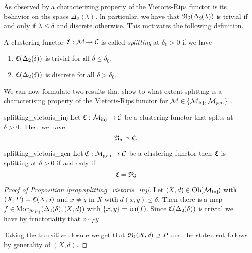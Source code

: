 As observed by \cite[Thm.~6.4]{Carlsson2010} a characterizing property of the Vietoris-Rips functor is its behavior on the space $\Delta_2(\lambda)$. In particular, we have that $\mathfrak{R}_\delta(\Delta_2(\lambda))$ is trivial if and only if $\lambda \le \delta$ and discrete otherwise.
This motivates the following definition.

\begin{definition}{}{}
    A clustering functor $\mathfrak{C}: \mathcal{M} \to \mathcal{C}$ is called \emph{splitting} at $\delta_0 > 0$ if we have
    \begin{enumerate}
        \item $\mathfrak{C}(\Delta_2(\delta))$ is trivial for all $\delta \leq \delta_0$.
        \item $\mathfrak{C}(\Delta_2(\delta))$ is discrete for all $\delta > \delta_0$.
    \end{enumerate}
\end{definition}

We can now formulate two results that show to what extent splitting is a characterizing property of the Vietoris-Rips functor for $\mathcal{M} \in \{{\mathcal{M}_\mathrm{inj}}, {\mathcal{M}_\mathrm{gen}}\}$ \cite[Thm.~6.4]{Carlsson2010}.

\begin{proposition}{}{splitting_vietoris_inj}
    Let $\mathfrak{C}: {\mathcal{M}_\mathrm{inj}} \to \mathcal{C}$ be a clustering functor that splits at $\delta > 0$. Then we have 
    $$
    \mathfrak{R}_\delta \preceq \mathfrak{C}.
    $$
\end{proposition}


\begin{proposition}{}{splitting_vietoris_gen}
    Let $\mathfrak{C}: {\mathcal{M}_\mathrm{gen}} \to \mathcal{C}$ be a clustering functor then $\mathfrak{C}$ is splitting at $\delta > 0$ if and only if 
    $$
    \mathfrak{C} = \mathfrak{R}_\delta
    $$
\end{proposition}

\begin{proof}[Proof of Proposition \ref{prop:splitting_vietoris_inj}]
    Let $(X,d) \in \mathrm {Ob}({\mathcal{M}_\mathrm{inj}})$ with $(X,P) = \mathfrak{C}(X,d)$ and $x \neq y$ in $X$ with $d(x,y) \leq \delta$.
    Then there is a map $f \in \mathrm {Mor}_{\mathcal{M}_\mathrm{inj}}(\Delta_2(\delta), (X,d))$ with $\{x,y\} = \operatorname*{im}(f)$.
    Since $\mathfrak{C}(\Delta_2(\delta))$ is trivial we have by functoriality that $x \sim_P y$

    Taking the transitive closure we get that $\mathfrak{R}_\delta(X,d) \preceq P$ and the statement follows by generality of $(X,d)$.
\end{proof}

